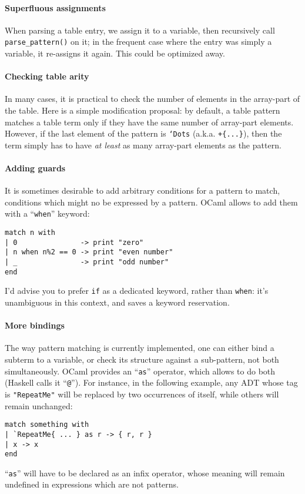 \paragraph{Superfluous assignments} When parsing a table entry, we
assign it to a variable, then recursively call {\tt parse\_pattern()}
on it; in the frequent case where the entry was simply a variable, it
re-assigns it again. This could be optimized away.

\paragraph{Checking table arity} In many cases, it is practical to
check the number of elements in the array-part of the table. Here is a
simple modification proposal: by default, a table pattern matches a
table term only if they have the same number of array-part
elements. However, if the last element of the pattern is {\tt`Dots}
(a.k.a. {\tt+\{...\}}), then the term simply has to have 
{\it at least} as many array-part elements as the pattern.

\paragraph{Adding guards}
It is sometimes desirable to add arbitrary conditions for a pattern to
match, conditions which might no be expressed by a pattern. OCaml
allows to add them with a ``\verb|when|'' keyword:
\begin{verbatim}
match n with
| 0               -> print "zero"
| n when n%2 == 0 -> print "even number"
| _               -> print "odd number"
end
\end{verbatim}
I'd advise you to prefer {\tt if} as a dedicated keyword, rather than
{\tt when}: it's unambiguous in this context, and saves a keyword
reservation. 

\paragraph{More bindings}
The way pattern matching is currently implemented, one can either bind
a subterm to a variable, or check its structure against a sub-pattern,
not both simultaneously. OCaml provides an ``\verb|as|'' operator,
which allows to do both (Haskell calls it ``\verb|@|''). For instance,
in the following example, any ADT whose tag is \verb|"RepeatMe"| will
be replaced by two occurrences of itself, while others will remain
unchanged:
\begin{verbatim}
match something with
| `RepeatMe{ ... } as r -> { r, r }
| x -> x
end
\end{verbatim}
``\verb|as|'' will have to be declared as an infix operator, whose
meaning will remain undefined in expressions which are not patterns.

